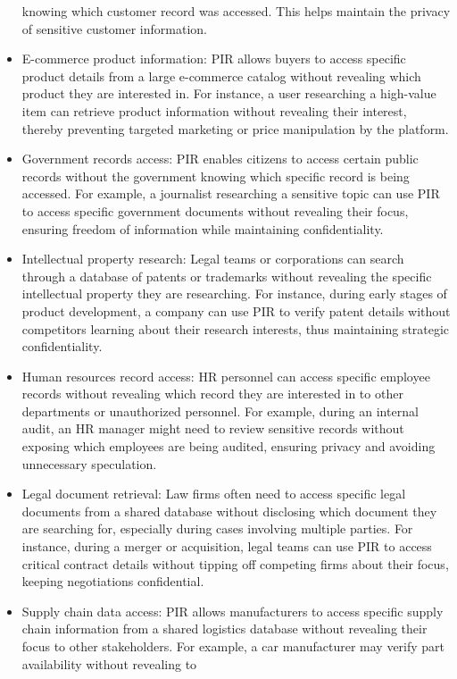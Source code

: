 \documentclass[
  letterpaper,
  DIV=11,
  numbers=noendperiod,
  oneside]{scrartcl}
\begin{document}
\begin{itemize}
  knowing which customer record was accessed. This helps maintain the
  privacy of sensitive customer information.
\item
  E-commerce product information: PIR allows buyers to access specific
  product details from a large e-commerce catalog without revealing
  which product they are interested in. For instance, a user researching
  a high-value item can retrieve product information without revealing
  their interest, thereby preventing targeted marketing or price
  manipulation by the platform.
\item
  Government records access: PIR enables citizens to access certain
  public records without the government knowing which specific record is
  being accessed. For example, a journalist researching a sensitive
  topic can use PIR to access specific government documents without
  revealing their focus, ensuring freedom of information while
  maintaining confidentiality.
\item
  Intellectual property research: Legal teams or corporations can search
  through a database of patents or trademarks without revealing the
  specific intellectual property they are researching. For instance,
  during early stages of product development, a company can use PIR to
  verify patent details without competitors learning about their
  research interests, thus maintaining strategic confidentiality.
\item
  Human resources record access: HR personnel can access specific
  employee records without revealing which record they are interested in
  to other departments or unauthorized personnel. For example, during an
  internal audit, an HR manager might need to review sensitive records
  without exposing which employees are being audited, ensuring privacy
  and avoiding unnecessary speculation.
\item
  Legal document retrieval: Law firms often need to access specific
  legal documents from a shared database without disclosing which
  document they are searching for, especially during cases involving
  multiple parties. For instance, during a merger or acquisition, legal
  teams can use PIR to access critical contract details without tipping
  off competing firms about their focus, keeping negotiations
  confidential.
\item
  Supply chain data access: PIR allows manufacturers to access specific
  supply chain information from a shared logistics database without
  revealing their focus to other stakeholders. For example, a car
  manufacturer may verify part availability without revealing to

\end{itemize}
\end{document}
